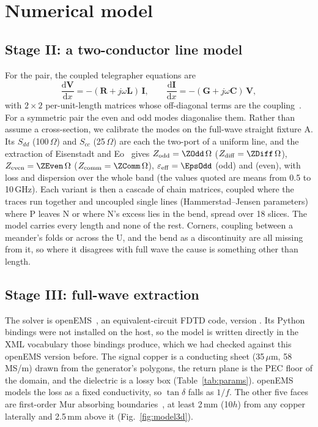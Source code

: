 \documentclass[10pt,twocolumn]{article}
\newcommand{\Sdd}[1]{S_{dd#1}}
\newcommand{\Scc}[1]{S_{cc#1}}
\newcommand{\eeff}{\varepsilon_{\mathrm{eff}}}
\begin{document}
\section{Numerical model}
\label{sec:model}

\subsection{Stage II: a two-conductor line model}

For the pair, the coupled telegrapher equations are
\begin{equation}
  \frac{\mathrm{d}\mathbf{V}}{\mathrm{d}x} = -(\mathbf{R} + j\omega\mathbf{L})\,\mathbf{I}, \qquad
  \frac{\mathrm{d}\mathbf{I}}{\mathrm{d}x} = -(\mathbf{G} + j\omega\mathbf{C})\,\mathbf{V},
  \label{eq:telegrapher}
\end{equation}
with $2\times2$ per-unit-length matrices whose off-diagonal terms are the coupling~\cite{paul_mtl}. For a
symmetric pair the even and odd modes diagonalise them. Rather than assume a cross-section, we calibrate the modes
on the full-wave straight fixture A. Its $\Sdd{}$ (100\,$\Omega$) and $\Scc{}$ (25\,$\Omega$) are each the
two-port of a uniform line, and the extraction of Eisenstadt and Eo~\cite{eisenstadt1992} gives
$Z_\mathrm{odd} = \ZOdd\,\Omega$ ($Z_\mathrm{diff} = \ZDiff\,\Omega$), $Z_\mathrm{even} = \ZEven\,\Omega$
($Z_\mathrm{comm} = \ZComm\,\Omega$), $\eeff = \EpsOdd$ (odd) and \EpsEven{} (even), with loss and dispersion over
the whole band (the values quoted are means from 0.5 to 10\,GHz). Each variant is then a cascade of chain matrices, coupled where the traces run
together and uncoupled single lines (Hammerstad--Jensen parameters) where P leaves N or where N's excess lies in
the bend, spread over 18 slices. The model carries every length and none of the rest. Corners, coupling between
a meander's folds or across the U, and the bend as a discontinuity are all missing from it, so where it disagrees
with full wave the cause is something other than length.

\subsection{Stage III: full-wave extraction}

The solver is openEMS~\cite{openems_intro,liebig2013}, an equivalent-circuit FDTD code, version
\texttt{\SolverVersion}. Its Python bindings were not installed on the host, so the model is written directly in
the XML vocabulary those bindings produce, which we had checked against this openEMS version before. The
signal copper is a conducting sheet (35\,$\mu$m, 58\,MS/m) drawn from the generator's polygons, the return plane
is the PEC floor of the domain, and the dielectric is a lossy box (Table~\ref{tab:params}). openEMS models the
loss as a fixed conductivity, so $\tan\delta$ falls as $1/f$. The other five faces are first-order Mur absorbing
boundaries~\cite{mur1981}, at least 2\,mm (10$h$) from any copper laterally and 2.5\,mm above it
(Fig.~\ref{fig:model3d}).
\end{document}
